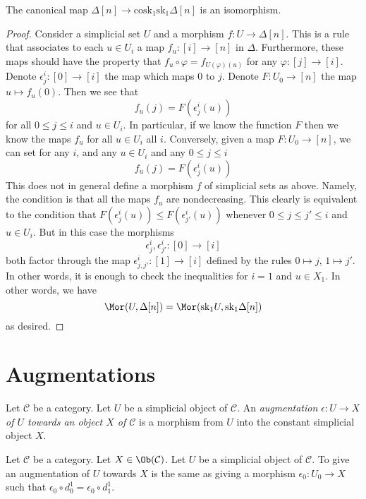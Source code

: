 \begin{lemma}
\label{lemma-simplex-cosk}
The canonical map
$\Delta[n] \to \text{cosk}_1 \text{sk}_1 \Delta[n]$
is an isomorphism.
\end{lemma}

\begin{proof}
Consider a simplicial set $U$ and a morphism
$f : U \to \Delta[n]$. This is a rule that associates
to each $u \in U_i$ a map $f_u : [i] \to [n]$ in $\Delta$.
Furthermore, these maps should have the property that
$f_u \circ \varphi = f_{U(\varphi)(u)}$ for any
$\varphi : [j] \to [i]$. Denote $\epsilon^i_j : [0] \to [i]$
the map which maps $0$ to $j$. Denote $F : U_0 \to [n]$
the map $u \mapsto f_u(0)$. Then we see that
$$
f_u(j) = F(\epsilon^i_j(u))
$$
for all $0 \leq j \leq i$ and $u \in U_i$.
In particular, if we know the function $F$
then we know the maps $f_u$ for all $u\in U_i$ all $i$.
Conversely, given a map $F : U_0 \to [n]$,
we can set for any $i$, and any $u \in U_i$
and any $0 \leq j \leq i$
$$
f_u(j) = F(\epsilon^i_j(u))
$$
This does not in general define a morphism $f$ of simplicial sets
as above. Namely, the condition is that all the maps $f_u$ are
nondecreasing. This clearly is equivalent to the condition
that $F(\epsilon^i_j(u)) \leq F(\epsilon^i_{j'}(u))$
whenever $0 \leq j \leq j' \leq i$ and $u \in U_i$. But in this
case the morphisms
$$
\epsilon^i_j, \epsilon^i_{j'} : [0] \to [i]
$$
both factor through the map
$\epsilon^i_{j, j'} : [1] \to [i]$ defined by the rules
$0 \mapsto j$, $1 \mapsto j'$.
In other words, it is enough to check the inequalities for
$i = 1$ and $u \in X_1$. In other words, we have
$$
\Mor(U, \Delta[n])
=
\Mor(\text{sk}_1 U, \text{sk}_1 \Delta[n])
$$
as desired.
\end{proof}



\section{Augmentations}
\label{section-augmentation}

\begin{definition}
\label{definition-augmentation}
Let $\mathcal{C}$ be a category.
Let $U$ be a simplicial object of $\mathcal{C}$.
An {\it augmentation $\epsilon : U \to X$ of
$U$ towards an object $X$ of $\mathcal{C}$}
is a morphism from $U$ into the constant simplicial
object $X$.
\end{definition}

\begin{lemma}
\label{lemma-augmentation-howto}
Let $\mathcal{C}$ be a category.
Let $X \in \Ob(\mathcal{C})$.
Let $U$ be a simplicial object of $\mathcal{C}$.
To give an augmentation of $U$ towards $X$ is
the same as giving a morphism $\epsilon_0 : U_0 \to X$
such that $\epsilon_0 \circ d^1_0 = \epsilon_0 \circ d^1_1$.
\end{lemma}

